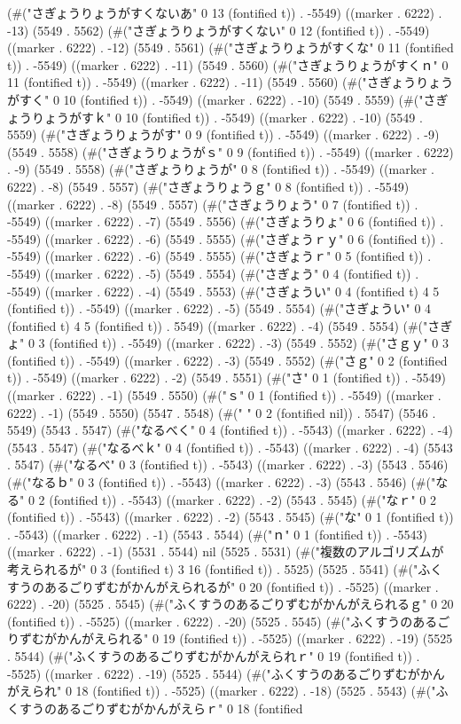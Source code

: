 {(#("さぎょうりょうがすくないあ" 0 13 (fontified t)) . -5549) ((marker . 6222) . -13) (5549 . 5562) (#("さぎょうりょうがすくない" 0 12 (fontified t)) . -5549) ((marker . 6222) . -12) (5549 . 5561) (#("さぎょうりょうがすくな" 0 11 (fontified t)) . -5549) ((marker . 6222) . -11) (5549 . 5560) (#("さぎょうりょうがすくｎ" 0 11 (fontified t)) . -5549) ((marker . 6222) . -11) (5549 . 5560) (#("さぎょうりょうがすく" 0 10 (fontified t)) . -5549) ((marker . 6222) . -10) (5549 . 5559) (#("さぎょうりょうがすｋ" 0 10 (fontified t)) . -5549) ((marker . 6222) . -10) (5549 . 5559) (#("さぎょうりょうがす" 0 9 (fontified t)) . -5549) ((marker . 6222) . -9) (5549 . 5558) (#("さぎょうりょうがｓ" 0 9 (fontified t)) . -5549) ((marker . 6222) . -9) (5549 . 5558) (#("さぎょうりょうが" 0 8 (fontified t)) . -5549) ((marker . 6222) . -8) (5549 . 5557) (#("さぎょうりょうｇ" 0 8 (fontified t)) . -5549) ((marker . 6222) . -8) (5549 . 5557) (#("さぎょうりょう" 0 7 (fontified t)) . -5549) ((marker . 6222) . -7) (5549 . 5556) (#("さぎょうりょ" 0 6 (fontified t)) . -5549) ((marker . 6222) . -6) (5549 . 5555) (#("さぎょうｒｙ" 0 6 (fontified t)) . -5549) ((marker . 6222) . -6) (5549 . 5555) (#("さぎょうｒ" 0 5 (fontified t)) . -5549) ((marker . 6222) . -5) (5549 . 5554) (#("さぎょう" 0 4 (fontified t)) . -5549) ((marker . 6222) . -4) (5549 . 5553) (#("さぎょうい" 0 4 (fontified t) 4 5 (fontified t)) . -5549) ((marker . 6222) . -5) (5549 . 5554) (#("さぎょうい" 0 4 (fontified t) 4 5 (fontified t)) . 5549) ((marker . 6222) . -4) (5549 . 5554) (#("さぎょ" 0 3 (fontified t)) . -5549) ((marker . 6222) . -3) (5549 . 5552) (#("さｇｙ" 0 3 (fontified t)) . -5549) ((marker . 6222) . -3) (5549 . 5552) (#("さｇ" 0 2 (fontified t)) . -5549) ((marker . 6222) . -2) (5549 . 5551) (#("さ" 0 1 (fontified t)) . -5549) ((marker . 6222) . -1) (5549 . 5550) (#("ｓ" 0 1 (fontified t)) . -5549) ((marker . 6222) . -1) (5549 . 5550) (5547 . 5548) (#("  " 0 2 (fontified nil)) . 5547) (5546 . 5549) (5543 . 5547) (#("なるべく" 0 4 (fontified t)) . -5543) ((marker . 6222) . -4) (5543 . 5547) (#("なるべｋ" 0 4 (fontified t)) . -5543) ((marker . 6222) . -4) (5543 . 5547) (#("なるべ" 0 3 (fontified t)) . -5543) ((marker . 6222) . -3) (5543 . 5546) (#("なるｂ" 0 3 (fontified t)) . -5543) ((marker . 6222) . -3) (5543 . 5546) (#("なる" 0 2 (fontified t)) . -5543) ((marker . 6222) . -2) (5543 . 5545) (#("なｒ" 0 2 (fontified t)) . -5543) ((marker . 6222) . -2) (5543 . 5545) (#("な" 0 1 (fontified t)) . -5543) ((marker . 6222) . -1) (5543 . 5544) (#("ｎ" 0 1 (fontified t)) . -5543) ((marker . 6222) . -1) (5531 . 5544) nil (5525 . 5531) (#("複数のアルゴリズムが考えられるが" 0 3 (fontified t) 3 16 (fontified t)) . 5525) (5525 . 5541) (#("ふくすうのあるごりずむがかんがえられるが" 0 20 (fontified t)) . -5525) ((marker . 6222) . -20) (5525 . 5545) (#("ふくすうのあるごりずむがかんがえられるｇ" 0 20 (fontified t)) . -5525) ((marker . 6222) . -20) (5525 . 5545) (#("ふくすうのあるごりずむがかんがえられる" 0 19 (fontified t)) . -5525) ((marker . 6222) . -19) (5525 . 5544) (#("ふくすうのあるごりずむがかんがえられｒ" 0 19 (fontified t)) . -5525) ((marker . 6222) . -19) (5525 . 5544) (#("ふくすうのあるごりずむがかんがえられ" 0 18 (fontified t)) . -5525) ((marker . 6222) . -18) (5525 . 5543) (#("ふくすうのあるごりずむがかんがえらｒ" 0 18 (fontified }
